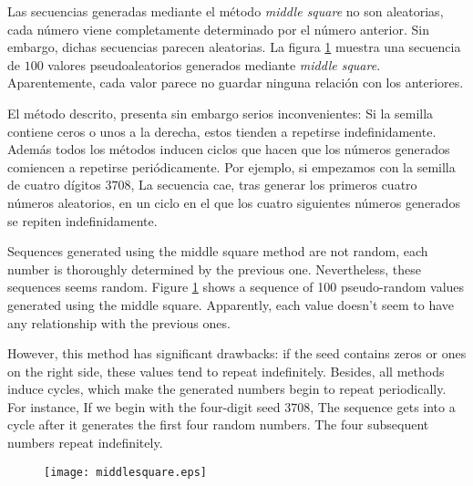 \begin{paracol}{2}
Las secuencias generadas mediante el método \emph{middle square} no son aleatorias, cada número viene completamente determinado por el número anterior. Sin embargo, dichas secuencias parecen aleatorias. La figura \ref{fig:middlesquare} muestra una secuencia de $100$ valores pseudoaleatorios generados mediante \emph{middle square}. Aparentemente, cada valor parece no guardar ninguna relación con los anteriores.

El método descrito, presenta sin embargo serios inconvenientes: Si la semilla contiene ceros o unos a la derecha, estos tienden a repetirse indefinidamente. Además todos los métodos inducen ciclos que hacen que los números generados comiencen a repetirse periódicamente. Por ejemplo, si empezamos con la semilla de cuatro dígitos $3708$,  La secuencia cae, tras generar los primeros cuatro números aleatorios, en un ciclo en el que los cuatro siguientes números generados se repiten indefinidamente.

\switchcolumn
Sequences generated using the middle square method are not random, each number is thoroughly determined by the previous one. Nevertheless, these sequences seems random. Figure \ref{fig:middlesquare} shows a sequence of 100 pseudo-random values generated using the middle square. Apparently, each value doesn't seem to have any relationship with the previous ones.

However, this method has significant drawbacks: if the seed contains zeros or ones on the right side, these values tend to repeat indefinitely. Besides, all methods induce cycles, which make the generated numbers begin to repeat periodically. For instance, If we begin with the four-digit seed $3708$, The sequence gets into a cycle after it generates the first four random numbers. The four subsequent numbers repeat indefinitely.
\end{paracol}
\begin{figure}[h]
	\centering
	\texttt{[image: middlesquare.eps]}
	\label{fig:middlesquare}
\end{figure}
